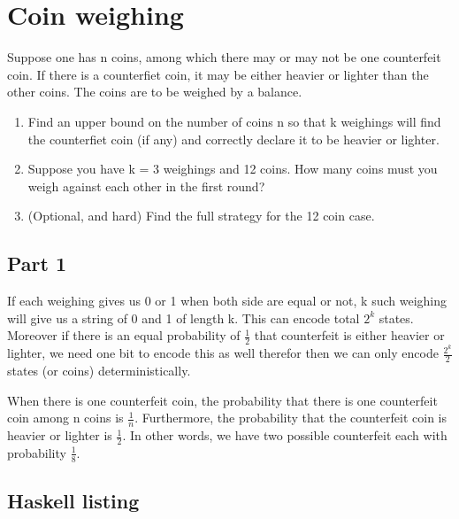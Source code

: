 \documentclass[a4paper,10pt]{article}
\begin{document}
\section{Coin weighing}

Suppose one has n coins, among which there may or may not be one counterfeit
coin. If there is a counterfiet coin, it may be either heavier or lighter than
the other coins. The coins are to be weighed by a balance.

\begin{enumerate}
    \item Find an upper bound on the number of coins n so that k weighings will find the
counterfiet coin (if any) and correctly declare it to be heavier or lighter.
    \item Suppose you have k = 3 weighings and 12 coins. How many coins must you weigh
against each other in the first round?
    \item (Optional, and hard) Find the full strategy for the 12 coin case.
\end{enumerate}

\subsection{Part 1}

If each weighing gives us 0 or 1 when both side are equal or not, k such
weighing will give us a string of 0 and 1 of length k. This can encode total
$2^k$ states. Moreover if there is an equal probability of $\frac{1}{2}$ that
counterfeit is either heavier or lighter, we need one bit to encode this as well
therefor then we can only encode $\frac{2^k}{2}$ states (or coins)
deterministically.

When there is one counterfeit coin, the probability that there is one
counterfeit coin among n coins is $\frac{1}{n}$. Furthermore, the probability
that the counterfeit coin is heavier or lighter is $\frac{1}{2}$. In other
words, we have two possible counterfeit each with probability $\frac{1}{8}$.


\begin{appendices}
    \section{Haskell listing}
    \label{listing:a}
    
\end{appendices}
\end{document}
